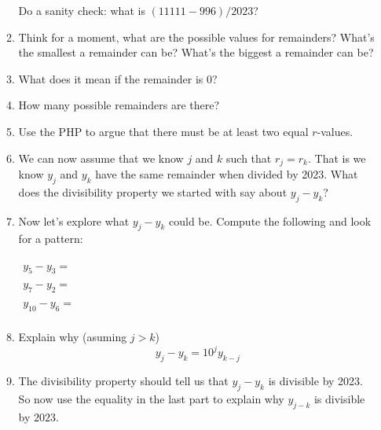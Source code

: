 \documentclass[12pt]{article}
\begin{document}
\begin{enumerate}
\begin{enumerate}
					Do a sanity check: what is $(11111-996)/2023$?
				\item Think for a moment, what are the possible values for remainders?  What's the smallest a remainder can be? What's the biggest a remainder can be?
						\vskip 1in
				\item What does it mean if the remainder is 0?
					\vskip 1in
				\item How many possible remainders are there?
					\vskip 1in
				\item Use the PHP to argue that there must be at least two equal $r$-values.
					\vskip 1in
				\item We can now assume that we know $j$ and $k$ such that $r_j=r_k$.
					That is we know $y_j$ and $y_k$ have the same remainder when divided by 2023.
					What does the divisibility property we started with say about $y_j-y_k$?
					\vskip 1in
				\item Now let's explore what $y_j-y_k$ could be.  Compute the following and look for a pattern: \\\\
					$\begin{array}{l}
						y_5-y_3=\\\\
						y_7-y_2=\\\\
						y_{10}-y_{6}=\\
					\end{array}$
				\item Explain why (asuming $j>k$)
					$$y_j-y_k=10^j y_{k-j}$$
					\vskip 1in
				\item The divisibility property should tell us that $y_j-y_k$ is divisible by 2023. So now use the equality in the last part to explain why $y_{j-k}$ is divisible by $2023$.
			\end{enumerate}
			
			
\end{enumerate}
\end{document}
